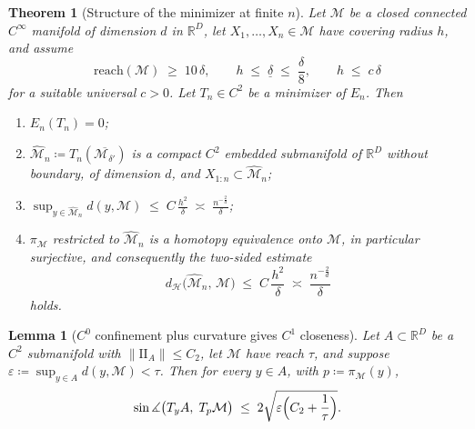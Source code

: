 \documentclass[11pt]{amsart}%
\theoremstyle{plain}
\newtheorem{theorem}[definition]{Theorem}
\newtheorem{lemma}[definition]{Lemma}
\newcommand{\R}{{\mathbb R}}
\def\calH{{\mathcal{H}}}
\newcommand{\1}{\mathbf{1}}
\newcommand{\M}{\mathcal{M}}
\newcommand{\II}{\mathrm{I\!I}}   %
\begin{document}
\begin{theorem}[Structure of the minimizer at finite $n$]
    \label{Thm:FiniteN}
    Let $\M$ be a closed connected $C^\infty$ manifold of dimension $d$ in $\R^D$, let
    $X_1,\dots,X_n\in \M$ have covering radius $h$, and assume
    \[
        \mathrm{reach}(\M)\;\ge\;10\,\delta,\qquad h\;\le\;\underline\delta\;\le\;\frac{\delta}{8},
        \qquad h\;\le\;c\,\delta
    \]
    for a suitable universal $c>0$. Let $T_n\in C^2$ be a minimizer of $E_n$. Then
    \begin{enumerate}[label=(\roman*),leftmargin=2.2em,itemsep=2pt,topsep=2pt]
        \item $E_n(T_n)=0$;\label{Finit-i}
        \item $\widehat{\M}_n\coloneqq T_n(\overline{\M_{\delta'}})$ is a compact
              $C^2$ embedded submanifold of $\R^D$ without boundary, of dimension $d$, and
              $X_{1:n}\subset\widehat{\M}_n$;\label{Finit-ii}
        \item $\displaystyle \sup_{y\in\widehat{\M}_n} d(y,\M)\;\le\;C\,\frac{h^2}{\delta}
              \;\asymp\;\frac{n^{-\frac{2}{d}}}{\delta}$;\label{Finit-iii}
        \item $\pi_\M$ restricted to $\widehat{\M}_n$ is a homotopy equivalence onto $\M$, in
              particular surjective, and consequently the two-sided estimate
              \[
                  d_\calH\bigl(\widehat{\M}_n,\,\M\bigr)\;\le\;C\,\frac{h^2}{\delta}
                  \;\asymp\;\frac{n^{-\frac{2}{d}}}{\delta}
              \]
              holds.\label{Finit-iv}
    \end{enumerate}
\end{theorem}

\begin{lemma}[$C^0$ confinement plus curvature gives $C^1$ closeness]
    \label{Lem:C1fromC2}
    Let $A\subset\R^D$ be a $C^2$ submanifold with $\|\II_A\|\le C_2$, let $\M$ have reach
    $\tau$, and suppose $\varepsilon\coloneqq\sup_{y\in A}d(y,\M)<\tau$. Then for every $y\in A$, with
    $p\coloneqq\pi_\M(y)$,
    \[
        \sin\measuredangle\bigl(T_yA,\;T_p\M\bigr)\;\le\;2\sqrt{\varepsilon\Bigl(C_2+\frac1\tau\Bigr)} .
    \]
\end{lemma}

\end{document}
